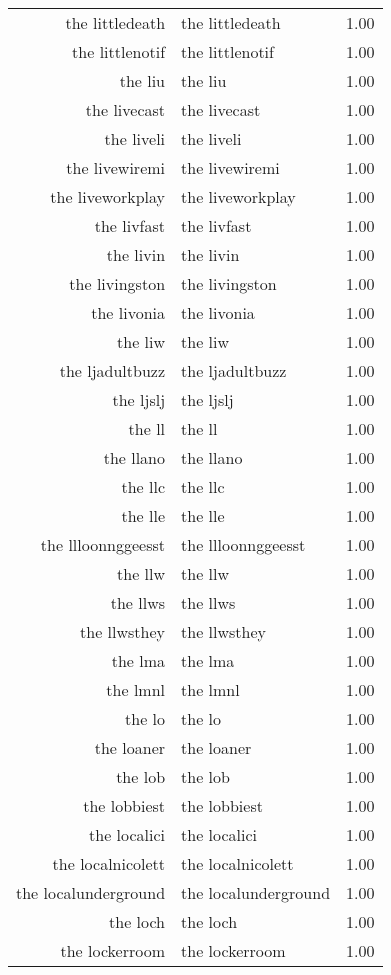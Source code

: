 \begin{table}[ht]
\begin{tabular}{rlr}
  the littledeath & the littledeath & 1.00 \\ 
  the littlenotif & the littlenotif & 1.00 \\ 
  the liu & the liu & 1.00 \\ 
  the livecast & the livecast & 1.00 \\ 
  the liveli & the liveli & 1.00 \\ 
  the livewiremi & the livewiremi & 1.00 \\ 
  the liveworkplay & the liveworkplay & 1.00 \\ 
  the livfast & the livfast & 1.00 \\ 
  the livin & the livin & 1.00 \\ 
  the livingston & the livingston & 1.00 \\ 
  the livonia & the livonia & 1.00 \\ 
  the liw & the liw & 1.00 \\ 
  the ljadultbuzz & the ljadultbuzz & 1.00 \\ 
  the ljslj & the ljslj & 1.00 \\ 
  the ll & the ll & 1.00 \\ 
  the llano & the llano & 1.00 \\ 
  the llc & the llc & 1.00 \\ 
  the lle & the lle & 1.00 \\ 
  the llloonnggeesst & the llloonnggeesst & 1.00 \\ 
  the llw & the llw & 1.00 \\ 
  the llws & the llws & 1.00 \\ 
  the llwsthey & the llwsthey & 1.00 \\ 
  the lma & the lma & 1.00 \\ 
  the lmnl & the lmnl & 1.00 \\ 
  the lo & the lo & 1.00 \\ 
  the loaner & the loaner & 1.00 \\ 
  the lob & the lob & 1.00 \\ 
  the lobbiest & the lobbiest & 1.00 \\ 
  the localici & the localici & 1.00 \\ 
  the localnicolett & the localnicolett & 1.00 \\ 
  the localunderground & the localunderground & 1.00 \\ 
  the loch & the loch & 1.00 \\ 
  the lockerroom & the lockerroom & 1.00 \\ 

\end{tabular}
\end{table}
